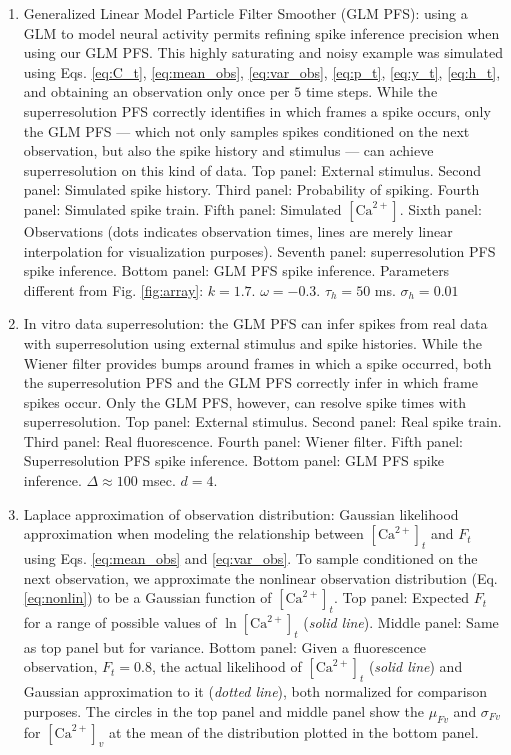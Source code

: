 \documentclass[10pt]{article}
\newcommand{\Ca}{[\text{Ca}^{2+}]}
\begin{document}
\begin{enumerate}
\item Generalized Linear Model Particle Filter Smoother (GLM PFS): using a GLM to model neural activity permits refining spike inference precision when using our GLM PFS. This highly saturating and noisy example was simulated using Eqs. \ref{eq:C_t}, \ref{eq:mean_obs}, \ref{eq:var_obs}, \ref{eq:p_t}, \ref{eq:y_t}, \ref{eq:h_t}, and obtaining an observation only once per $5$ time steps. While the superresolution PFS correctly identifies in which frames a spike occurs, only the GLM PFS --- which not only samples spikes conditioned on the next observation, but also the spike history and stimulus --- can achieve superresolution on this kind of data. Top panel: External stimulus.  Second panel: Simulated spike history. Third panel: Probability of spiking.  Fourth panel: Simulated spike train.  Fifth panel: Simulated $\Ca$.  Sixth panel: Observations (dots indicates observation times, lines are merely linear interpolation for visualization purposes). Seventh panel: superresolution PFS spike inference.  Bottom panel: GLM PFS spike inference.  Parameters different from Fig. \ref{fig:array}: $k=1.7$. $\omega=-0.3$. $\tau_h=50$ ms. $\sigma_h=0.01$
\item In vitro data superresolution: the GLM PFS can infer spikes from real data with superresolution using external stimulus and spike histories.  While the Wiener filter provides bumps around frames in which a spike occurred, both the superresolution PFS and the GLM PFS correctly infer in which frame spikes occur.  Only the GLM PFS, however, can resolve spike times with superresolution. Top panel: External stimulus.  Second panel: Real spike train.  Third panel: Real fluorescence. Fourth panel: Wiener filter.  Fifth panel: Superresolution PFS spike inference.  Bottom panel: GLM PFS spike inference.  $\Delta \approx 100$ msec. $d=4$. 
\item Laplace approximation of observation distribution: Gaussian likelihood approximation when modeling the relationship between $\Ca_t$ and $F_t$ using Eqs. \ref{eq:mean_obs} and \ref{eq:var_obs}.  To sample conditioned on the next observation, we approximate the nonlinear observation distribution (Eq. \ref{eq:nonlin}) to be a Gaussian function of $\Ca_t$.  Top panel: Expected $F_t$ for a range of possible values of $\ln \Ca_t$ (\emph{solid line}).  Middle panel: Same as top panel but for variance. Bottom panel: Given a fluorescence observation, $F_t=0.8$, the actual likelihood of $\Ca_t$ (\emph{solid line}) and Gaussian approximation to it (\emph{dotted line}), both normalized for comparison purposes. The circles in the top panel and middle panel show the $\mu_{Fv}$ and $\sigma_{Fv}$ for $\Ca_v$ at the mean of the distribution plotted in the bottom panel.

\end{enumerate}
\end{document}

